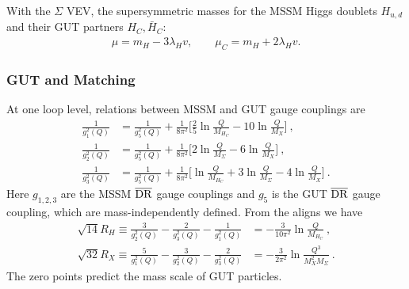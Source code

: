 \documentclass[12pt]{article}
\newcommand{\1}{\mbox{1}\hspace{-0.25em}\mbox{l}}
\begin{document}
%
With the $\Sigma$ VEV, the supersymmetric masses for the 
MSSM Higgs doublets $H_{u,d}$ and their GUT partners $H_C, \bar{H}_C$:
%
\begin{align}
  \mu = m_H - 3 \lambda_H v,
\qquad
  \mu_C = m_H + 2 \lambda_H v.
\label{eq:mu-GUT}
\end{align}


\subsubsection{GUT and Matching}
At one loop level, relations between MSSM and GUT gauge couplings are
\begin{align}
 \frac{1}{g_1^2(Q)}&=\frac{1}{g_5^2(Q)}+\frac{1}{8\pi^2}\biggl[
\frac{2}{5}
\ln \frac{Q}{M_{H_C}}-10\ln\frac{Q}{M_X}
\biggr]~,\nonumber \\
 \frac{1}{g_2^2(Q)}&=\frac{1}{g_5^2(Q)}+\frac{1}{8\pi^2}\biggl[
2\ln \frac{Q}{M_\Sigma}-6\ln\frac{Q}{M_X}
\biggr]~,\nonumber \\
 \frac{1}{g_3^2(Q)}&=\frac{1}{g_5^2(Q)}+\frac{1}{8\pi^2}\biggl[
\ln \frac{Q}{M_{H_C}}+3\ln \frac{Q}{M_\Sigma}-4\ln\frac{Q}{M_X}
\biggr]~.
\end{align}
Here $g_{1,2,3}$ are the MSSM $\overline{\rm DR}$ gauge couplings and $g_5$ is the
GUT $\overline{\rm DR}$ gauge coupling, which are mass-independently defined.
From the aligns we have
\begin{align}
\sqrt{14} R_H \equiv \frac{3}{g_2^2(Q)}- \frac{2}{g_3^2(Q)}- \frac{1}{g_1^2(Q)}
&=-\frac{3}{10\pi^2}\ln \frac{Q}{M_{H_C}}~, \nonumber \\
\sqrt{32} R_X \equiv \frac{5}{g_1^2(Q)}- \frac{3}{g_2^2(Q)}- \frac{2}{g_3^2(Q)}
&=-\frac{3}{2\pi^2}\ln \frac{Q^3}{M_X^2M_{\Sigma}}~.
\label{conditions}
\end{align}
The zero points predict the mass scale of GUT particles.
\end{document}
